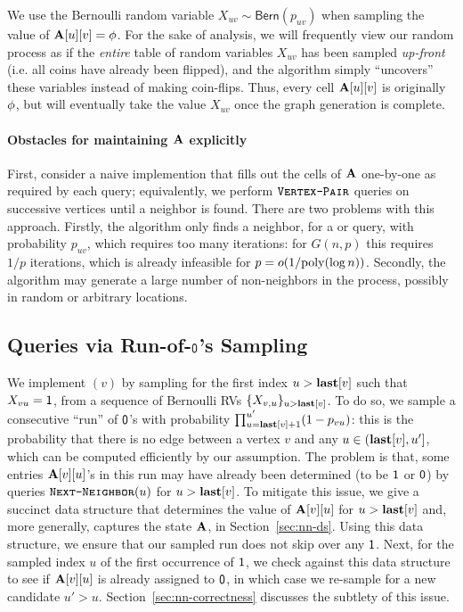 We use the Bernoulli random variable $X_{uv} \sim \mathsf{Bern}(p_{uv})$ when sampling the value of $\mathbf{A}[u][v]=\phi$.
For the sake of analysis, we will frequently view our random process as if the \emph{entire} table of random variables $X_{uv}$ has been sampled
\emph{up-front} (i.e. all coins have already been flipped), and the algorithm simply ``uncovers'' these variables instead of making coin-flips.
Thus, every cell $\mathbf{A}[u][v]$ is originally $\phi$, but will eventually take the value $X_{uv}$ once the graph generation is complete.

\paragraph*{Obstacles for maintaining $\mathbf{A}$ explicitly}
First, consider a naive implemention that fills out the cells of $\mathbf{A}$ one-by-one as required by each query;
equivalently, we perform $\texttt{\textsc{Vertex-Pair}}$ queries on successive vertices until a neighbor is found.
There are two problems with this approach.
Firstly, the algorithm only finds a neighbor, for a  or  query, with probability $p_{uv}$,
which requires too many iterations: for $G(n,p)$ this requires $1/p$ iterations, which is already infeasible for $p = o(1/\mathrm{poly}(\log n))$.
Secondly, the algorithm may generate a large number of non-neighbors in the process, possibly in random or arbitrary locations.




\subsection{ Queries via Run-of-$\mathsf{0}$'s Sampling}\label{sec:ER-rand}

We implement $(v)$ by sampling for the first index $u > \mathbf{last}[v]$ such that $X_{vu}=\mathsf{1}$,
from a sequence of Bernoulli RVs $\{X_{v, u}\}_{u > \mathbf{last}[v]}$.
To do so, we sample a consecutive ``run'' of $\mathsf{0}$'s with probability $\prod_{u=\mathbf{last}[v]+1}^{u'} (1-p_{vu})$:
this is the probability that there is no edge between a vertex $v$ and any $u \in (\mathbf{last}[v],u']$, which can be computed efficiently by our assumption.
The problem is that, some entries $\mathbf{A}[v][u]$'s in this run may have already been determined (to be $\mathsf{1}$ or $\mathsf{0}$)
by queries $\texttt{\textsc{Next-Neighbor}}(u)$ for $u > \mathbf{last}[v]$.
To mitigate this issue, we give a succinct data structure that determines the value of $\mathbf{A}[v][u]$ for $u >\mathbf{last}[v]$ and,
more generally, captures the state $\mathbf{A}$, in Section~\ref{sec:nn-ds}.
Using this data structure, we ensure that our sampled run does not skip over any $\mathsf{1}$.
Next, for the sampled index $u$ of the first occurrence of $\mathsf{1}$,
we check against this data structure to see if $\mathbf{A}[v][u]$ is already assigned to $\mathsf{0}$, in which case we re-sample for a new candidate $u' > u$.
Section~\ref{sec:nn-correctness} discusses the subtlety of this issue.

